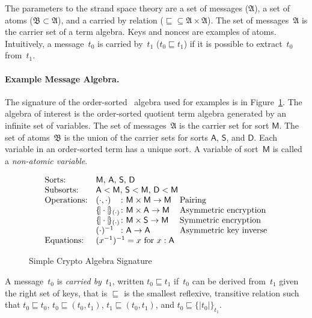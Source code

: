 \documentclass[12pt]{article}
\newcommand{\srt}[1]{\ensuremath{\mathsf{#1}}}
\newcommand{\enc}[2]{\ensuremath{\{\!|#1|\!\}_{#2}}}
\newcommand{\alg}[1]{\ensuremath{\mathfrak{#1}}}
\newcommand{\msg}{\alg{A}}
\newcommand{\atm}{\alg{B}}
\begin{document}
The parameters to the strand space theory are a set of messages
(\msg), a set of atoms ($\atm\subset\msg$), and a carried by relation
(${\sqsubseteq}\subseteq\msg\times\msg$).  The set of messages~{\msg}
is the carrier set of a term algebra.  Keys and nonces are examples of
atoms.  Intuitively, a message~$t_0$ is carried by~$t_1$
($t_0\sqsubseteq t_1$) if it is possible to extract~$t_0$ from~$t_1$.

\paragraph{Example Message Algebra.}

The signature of the order-sorted~\cite{GoguenMeseguer92} algebra used
for examples is in Figure~\ref{fig:signature}.  The algebra of
interest is the order-sorted quotient term algebra generated by an
infinite set of variables.  The set of messages~{\msg} is the carrier
set for sort \srt{M}.  The set of atoms~{\atm} is the union of the
carrier sets for sorts \srt{A}, \srt{S}, and \srt{D}.  Each variable
in an order-sorted term has a unique sort.  A variable of sort~\srt{M}
is called a \emph{non-atomic variable}.

\begin{figure}
$$\begin{array}{ll@{{}\colon{}}ll}
\mbox{Sorts:}&
\multicolumn{3}{l}{\mbox{\srt{M}, \srt{A}, \srt{S}, \srt{D}}}\\
\mbox{Subsorts:}&
\multicolumn{3}{l}{\mbox{$\srt{A}<\srt{M}$, $\srt{S}<\srt{M}$,
    $\srt{D}<\srt{M}$}}\\
\mbox{Operations:}&(\cdot,\cdot)&\srt{M}\times\srt{M}\to\srt{M}
&\mbox{Pairing}\\
&\enc{\cdot}{(\cdot)}&\srt{M}\times\srt{A}\to\srt{M}
&\mbox{Asymmetric encryption}\\
&\enc{\cdot}{(\cdot)}&\srt{M}\times\srt{S}\to\srt{M}
&\mbox{Symmetric encryption}\\
&(\cdot)^{-1}&\srt{A}\to\srt{A}
&\mbox{Asymmetric key inverse}\\
\mbox{Equations:}&\multicolumn{3}{l}{(x^{-1})^{-1}=x\mbox{ for $x:\srt{A}$}}
\end{array}$$
\caption{Simple Crypto Algebra Signature}\label{fig:signature}
\end{figure}

A message~$t_0$ is \emph{carried by}~$t_1$, written $t_0\sqsubseteq
t_1$ if~$t_0$ can be derived from~$t_1$ given the right set of keys,
that is $\sqsubseteq$ is the smallest reflexive, transitive relation
such that $t_0\sqsubseteq t_0$, $t_0\sqsubseteq (t_0, t_1)$,
$t_1\sqsubseteq (t_0, t_1)$, and $t_0\sqsubseteq\enc{t_0}{t_1}$.
\end{document}
